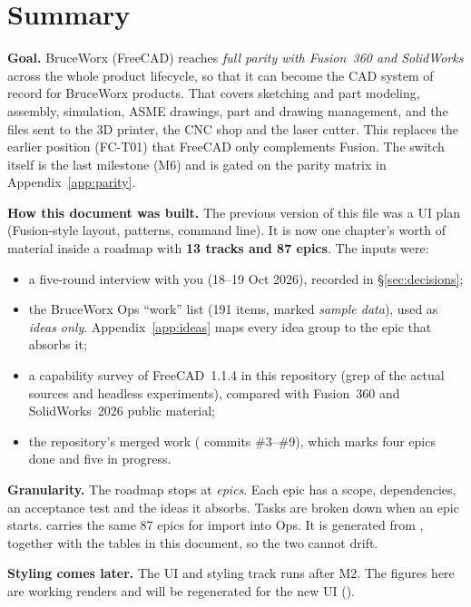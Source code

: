 \section{Summary}\label{sec:summary}

\textbf{Goal.} BruceWorx (FreeCAD) reaches \emph{full parity with Fusion~360 and SolidWorks} across the
whole product lifecycle, so that it can become the CAD system of record for BruceWorx products. That covers
sketching and part modeling, assembly, simulation, ASME drawings, part and drawing management, and the
files sent to the 3D printer, the CNC shop and the laser cutter. This replaces the earlier position
(FC-T01) that FreeCAD only complements Fusion. The switch itself is the last milestone (M6) and is gated on the parity
matrix in Appendix~\ref{app:parity}.

\textbf{How this document was built.} The previous version of this file was a UI plan (Fusion-style
layout, patterns, command line). It is now one chapter's worth of material inside a roadmap with
\textbf{13 tracks and 87 epics}. The inputs were:
\begin{itemize}
  \item a five-round interview with you (18--19 Oct 2026), recorded in \S\ref{sec:decisions};
  \item the BruceWorx Ops ``work'' list (191 items, marked \emph{sample data}), used as \emph{ideas only}.
        Appendix~\ref{app:ideas} maps every idea group to the epic that absorbs it;
  \item a capability survey of FreeCAD~1.1.4 in this repository (grep of the actual sources and headless
        experiments), compared with Fusion~360 and SolidWorks~2026 public material;
  \item the repository's merged work (\code{[BW]} commits \#3--\#9), which marks four epics done and five in
        progress.
\end{itemize}

\textbf{Granularity.} The roadmap stops at \emph{epics}. Each epic has a scope, dependencies, an acceptance test and
the ideas it absorbs. Tasks are broken down when an epic starts.  carries the same
87 epics for import into Ops. It is generated from , together with the tables in this
document, so the two cannot drift.

\textbf{Styling comes later.} The UI and styling track runs after M2. The figures here are working renders
and will be regenerated for the new UI ().

